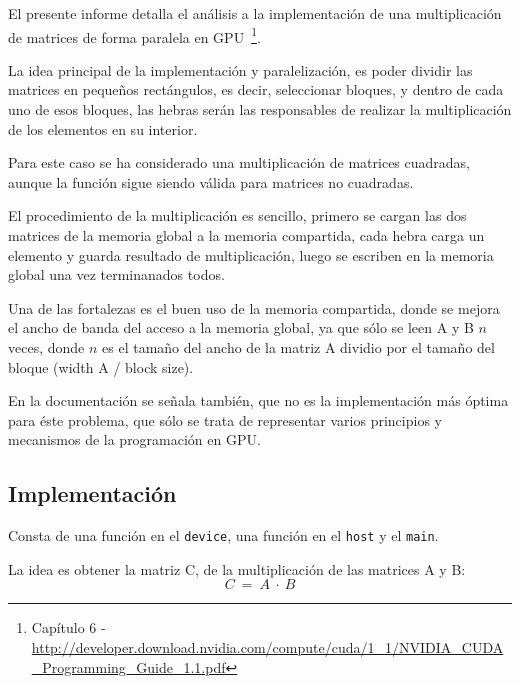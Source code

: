 El presente informe detalla el análisis a la implementación
de una multiplicación de matrices de forma paralela en GPU~\footnote{
Capítulo 6 - \url{http://developer.download.nvidia.com/compute/cuda/1_1/NVIDIA_CUDA_Programming_Guide_1.1.pdf} 
}.

La idea principal de la implementación y paralelización,
es poder dividir las matrices en pequeños rectángulos,
es decir, seleccionar bloques, y dentro de cada uno de esos bloques,
las hebras serán las responsables de realizar la multiplicación
de los elementos en su interior.

Para este caso se ha considerado una multiplicación de matrices
cuadradas, aunque la función sigue siendo válida para matrices
no cuadradas.

El procedimiento de la multiplicación es sencillo,
primero se cargan las dos matrices de la memoria global a la memoria compartida,
cada hebra carga un elemento y guarda resultado de multiplicación,
luego se escriben en la memoria global una vez terminanados todos.

Una de las fortalezas es el buen uso de la memoria compartida,
donde se mejora el ancho de banda del acceso a la memoria global,
ya que sólo se leen A y B $n$ veces, donde $n$ es el tamaño del ancho de la matriz
A dividio por el tamaño del bloque (width A / block size).

En la documentación se señala también,
que no es la implementación más óptima para éste problema,
que sólo se trata de representar varios principios y mecanismos
de la programación en GPU.

\subsection{Implementación}

Consta de una función en el \texttt{device},
una función en el \texttt{host} y el \texttt{main}.

La idea es obtener la matriz C, de la multiplicación de las matrices A y B:
$$C\ =\ A\ \cdot\ B$$

